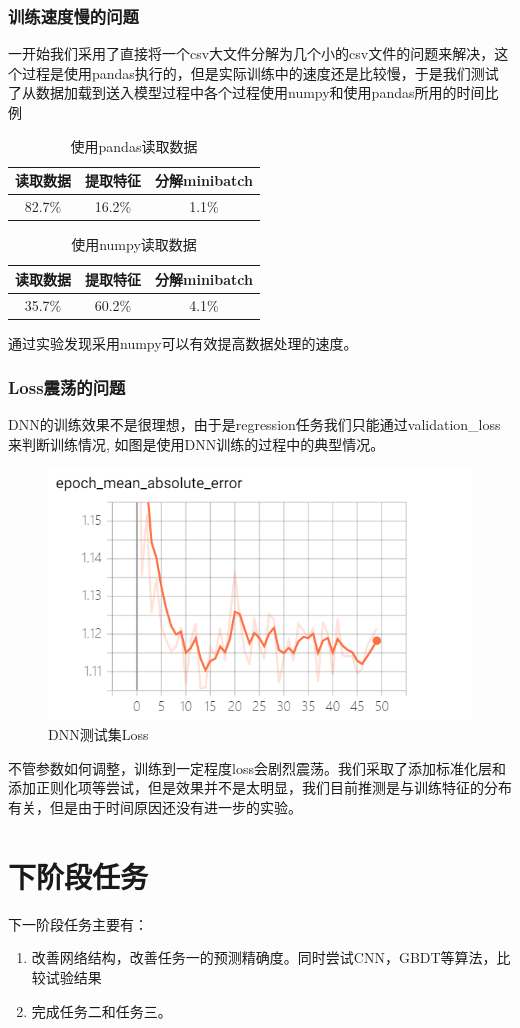 \documentclass[UTF8]{ctexart}
\begin{document}
\subsubsection{训练速度慢的问题}
一开始我们采用了直接将一个csv大文件分解为几个小的csv文件的问题来解决，这个过程是使用pandas执行的，但是实际训练中的速度还是比较慢，于是我们测试了从数据加载到送入模型过程中各个过程使用numpy和使用pandas所用的时间比例\\
\begin{table}[!htbp]
    \centering
    \begin{tabular}{|c|c|c|}
        \hline
        读取数据 & 提取特征 & 分解minibatch \\
        \hline
        82.7\% & 16.2\% & 1.1\% \\
        \hline
    \end{tabular}
    \caption{使用pandas读取数据}
\end{table}
\begin{table}[!htbp]
    \centering
    \begin{tabular}{|c|c|c|}
        \hline
        读取数据 & 提取特征 & 分解minibatch \\
        \hline
        35.7\% & 60.2\% & 4.1\% \\
        \hline
    \end{tabular}
    \caption{使用numpy读取数据}
\end{table}
通过实验发现采用numpy可以有效提高数据处理的速度。
\subsubsection{Loss震荡的问题}
DNN的训练效果不是很理想，由于是regression任务我们只能通过validation\_loss来判断训练情况, 如图是使用DNN训练的过程中的典型情况。
\begin{figure}[h]
    \centering
    \includegraphics[]{result.png}
    \caption{DNN测试集Loss}
\end{figure}
不管参数如何调整，训练到一定程度loss会剧烈震荡。我们采取了添加标准化层和添加正则化项等尝试，但是效果并不是太明显，我们目前推测是与训练特征的分布有关，但是由于时间原因还没有进一步的实验。
\section{下阶段任务}
下一阶段任务主要有：\\
\begin{enumerate}
    \item 改善网络结构，改善任务一的预测精确度。同时尝试CNN，GBDT等算法，比较试验结果
    \item 完成任务二和任务三。
\end{enumerate}
\end{document}
